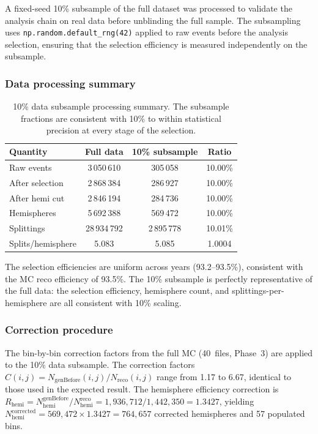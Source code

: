 \documentclass[11pt,a4paper]{article}
\begin{document}
A fixed-seed 10\% subsample of the full dataset was processed to validate
the analysis chain on real data before unblinding the full sample.
The subsampling uses \texttt{np.random.default\_rng(42)} applied to raw
events before the analysis selection, ensuring that the selection
efficiency is measured independently on the subsample.

\subsubsection{Data processing summary}

\begin{table}[htbp]
\centering
\caption{10\% data subsample processing summary.  The subsample
  fractions are consistent with 10\% to within statistical precision
  at every stage of the selection.}
\label{tbl:10pct-summary}
\begin{tabular}{lccc}
\toprule
Quantity & Full data & 10\% subsample & Ratio \\
\midrule
Raw events & 3\,050\,610 & 305\,058 & 10.00\% \\
After selection & 2\,868\,384 & 286\,927 & 10.00\% \\
After hemi cut & 2\,846\,194 & 284\,736 & 10.00\% \\
Hemispheres & 5\,692\,388 & 569\,472 & 10.00\% \\
Splittings & 28\,934\,792 & 2\,895\,778 & 10.01\% \\
Splits/hemisphere & 5.083 & 5.085 & 1.0004 \\
\bottomrule
\end{tabular}
\end{table}

The selection efficiencies are uniform across years (93.2--93.5\%),
consistent with the MC reco efficiency of 93.5\%.  The 10\% subsample
is perfectly representative of the full data: the selection efficiency,
hemisphere count, and splittings-per-hemisphere are all consistent with
10\% scaling.

\subsubsection{Correction procedure}

The bin-by-bin correction factors from the full MC (40~files, Phase~3)
are applied to the 10\% data subsample.  The correction factors
$C(i,j) = N_\text{genBefore}(i,j) / N_\text{reco}(i,j)$ range from 1.17
to 6.67, identical to those used in the expected result.  The hemisphere
efficiency correction is $R_\text{hemi} = N_\text{hemi}^\text{genBefore}
/ N_\text{hemi}^\text{reco} = 1{,}936{,}712 / 1{,}442{,}350 = 1.3427$,
yielding $N_\text{hemi}^\text{corrected} = 569{,}472 \times 1.3427
= 764{,}657$ corrected hemispheres and 57 populated bins.
\end{document}
